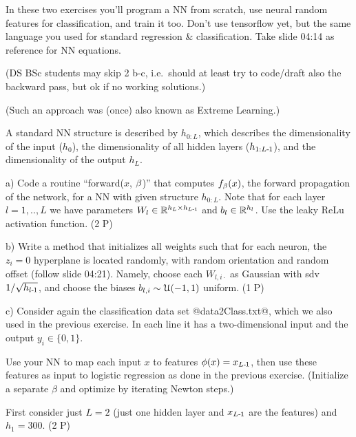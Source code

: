 

\renewcommand{\course}{Machine Learning}
\renewcommand{\exnum}{5}

\exercises
{}
\exercisestitle


In these two exercises you'll program a NN from scratch, use neural random features for classification, and train it too. Don't use tensorflow yet, but the same language you used for standard regression \& classification. Take slide 04:14 as reference for NN equations.

(DS BSc students may skip 2 b-c, i.e.\ should at least try to code/draft also the backward pass, but ok if no working solutions.)



(Such an approach was (once) also known as Extreme Learning.)

A standard NN structure is described by $h_{0:L}$, which  describes the dimensionality of the input ($h_0$), the dimensionality of all hidden layers ($h_{1:L{{\hspace*{-.0pt}\text{\rm -}\hspace*{-.5pt}}1}}$), and the dimensionality of the output $h_L$.

a) Code a routine ``forward($x$, $\beta$)'' that computes $f_\beta(x)$, the
forward propagation of the network, for a NN with given structure $h_{0:L}$. Note that for each layer $l=1,..,L$ we have parameters $W_l\in{\mathbb{R}}^{h_L\times h_{L{{\hspace*{-.0pt}\text{\rm -}\hspace*{-.5pt}}1}}}$ and $b_l \in {\mathbb{R}}^{h_l}$. Use the leaky ReLu activation function. (2 P)

b) Write a method that initializes all weights such that for each neuron, the $z_i=0$ hyperplane is located randomly, with random orientation and random offset (follow slide 04:21). Namely, choose each $W_{l,i\cdot}$ as Gaussian with sdv $1/\sqrt{h_{l{{\hspace*{-.0pt}\text{\rm -}\hspace*{-.5pt}}1}}}$, and choose the biases $b_{l,i} \sim {\cal U}(-1,1)$ uniform. (1 P)

c) Consider again the classification data set @data2Class.txt@, which we also used in the previous exercise. In each line it has a two-dimensional input and the output $y_i\in\{0,1\}$.

Use your NN to map each input $x$ to features $\phi(x) = x_{L{{\hspace*{-.0pt}\text{\rm -}\hspace*{-.5pt}}1}}$, then use these features as input to logistic regression as done in the previous exercise.
(Initialize a separate $\beta$ and optimize by iterating Newton steps.)

First consider just $L=2$ (just one hidden layer and $x_{L{{\hspace*{-.0pt}\text{\rm -}\hspace*{-.5pt}}1}}$ are the features) and $h_1=300$. (2 P)

